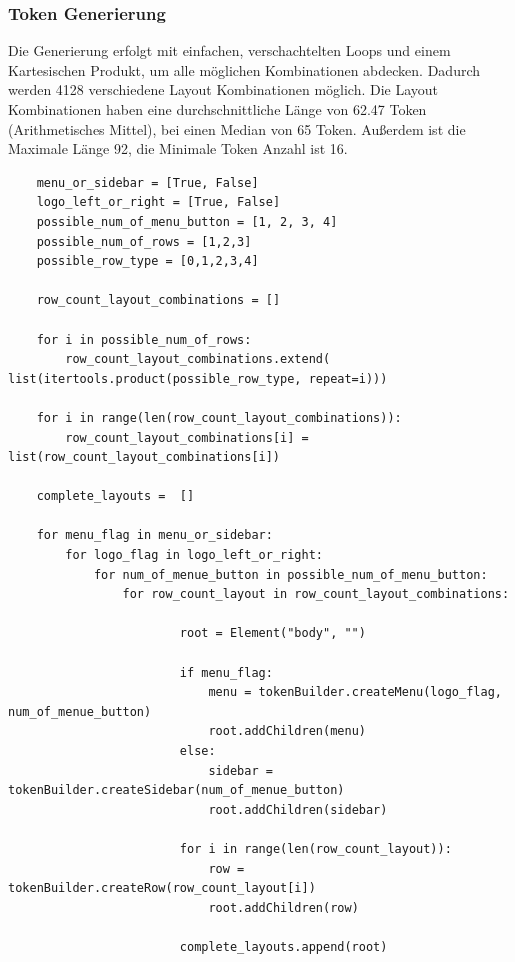 \documentclass[pdftex,a4paper,halfparskip, article]{scrartcl}
\begin{document}
\subsubsection{Token Generierung}

Die Generierung erfolgt mit einfachen, verschachtelten Loops und einem Kartesischen Produkt, um alle möglichen Kombinationen abdecken. Dadurch werden 4128 verschiedene Layout Kombinationen möglich. 
Die Layout Kombinationen haben eine durchschnittliche Länge von 62.47 Token (Arithmetisches Mittel), bei einen Median von 65 Token. Außerdem ist die Maximale Länge 92, die Minimale Token Anzahl ist 16.

\begin{verbatim}
    menu_or_sidebar = [True, False]
    logo_left_or_right = [True, False]
    possible_num_of_menu_button = [1, 2, 3, 4]
    possible_num_of_rows = [1,2,3]
    possible_row_type = [0,1,2,3,4]

    row_count_layout_combinations = []

    for i in possible_num_of_rows:
        row_count_layout_combinations.extend( list(itertools.product(possible_row_type, repeat=i)))

    for i in range(len(row_count_layout_combinations)):
        row_count_layout_combinations[i] = list(row_count_layout_combinations[i])

    complete_layouts =  []

    for menu_flag in menu_or_sidebar:
        for logo_flag in logo_left_or_right:
            for num_of_menue_button in possible_num_of_menu_button:
                for row_count_layout in row_count_layout_combinations:

                        root = Element("body", "")

                        if menu_flag:
                            menu = tokenBuilder.createMenu(logo_flag, num_of_menue_button)
                            root.addChildren(menu)
                        else:
                            sidebar = tokenBuilder.createSidebar(num_of_menue_button)
                            root.addChildren(sidebar)

                        for i in range(len(row_count_layout)):
                            row = tokenBuilder.createRow(row_count_layout[i])
                            root.addChildren(row)

                        complete_layouts.append(root)
\end{verbatim}
\end{document}
